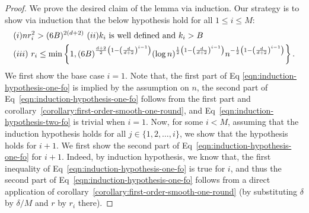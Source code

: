 \begin{proof}
We prove the desired claim of the lemma via induction. Our strategy is 
to show via induction that the below hypothesis hold for all $1\leq i\leq M$:
\begin{align}
&(i) n r_i^2 > (6B)^{2(d+2)}~
(ii) k_i ~\text{is well defined}~\text{and}~k_i > B
\label{eqn:induction-hypothesis-one-fo} \\
&(iii)~r_i \leq \min
	\left\{1, (6B)^{\frac{d+2}{2}\left(1-\left(\frac{d}{d+2}\right)^{i-1}\right)}
		(\log n)^{\frac{1}{2} \left(1-\left(\frac{d}{d+2}\right)^{i-1}\right)}
		n^{-\frac{1}{2} \left(1-\left(\frac{d}{d+2}\right)^{i-1}\right)}\right\}
\label{eqn:induction-hypothesis-two-fo}.
\end{align} 
We first show the base case $i=1$. Note that, the first part of Eq
\eqref{eqn:induction-hypothesis-one-fo} is implied by the assumption 
on $n$, the second part of Eq~\eqref{eqn:induction-hypothesis-one-fo}
follows from the first part and corollary~\ref{corollary:first-order-smooth-one-round},
and Eq~\eqref{eqn:induction-hypothesis-two-fo} is trivial when $i=1$. 
Now, for some $i < M$, assuming that the induction hypothesis holds for 
all $j \in \{1, 2, \ldots, i\}$, we show that the hypothesis holds for $i+1$.  
We first show the second part of Eq~\eqref{eqn:induction-hypothesis-one-fo}
for $i+1$. Indeed, by induction hypothesis, we know that, the first 
inequality of Eq~\eqref{eqn:induction-hypothesis-one-fo} is true for $i$,
and thus the second part of Eq~\eqref{eqn:induction-hypothesis-one-fo}
follows from a direct application of corollary~\ref{corollary:first-order-smooth-one-round}
(by substituting $\delta$ by $\delta/M$ and $r$ by $r_i$ there).

\end{proof}
